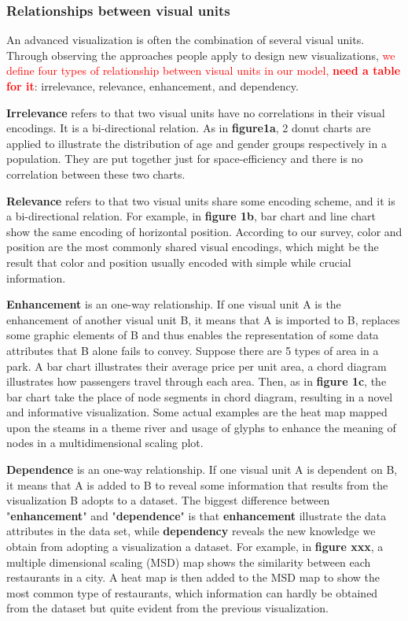 \documentclass[review,journal]{vgtc}         %
\newcommand{\wrong}[1]{\textcolor{red}{#1}}
\begin{document}
\subsubsection{Relationships between visual units}
An advanced visualization is often the combination of several visual units. Through observing the approaches people apply to design new visualizations, \wrong{we define four types of relationship between visual units in our model, \textbf{need a table for it}}: irrelevance, relevance, enhancement, and dependency. \par
\textbf{Irrelevance} refers to that two visual units have no correlations in their visual encodings. It is a bi-directional relation. As in \textbf{figure1a}, 2 donut charts are applied to illustrate the distribution of age and gender groups respectively in a population. They are put together just for space-efficiency and there is no correlation between these two charts. \par
\textbf{Relevance} refers to that two visual units share some encoding scheme, and it is a bi-directional relation. For example, in \textbf{figure 1b}, bar chart and line chart show the same encoding of horizontal position. According to our survey, color and position are the most commonly shared visual encodings, which might be the result that color and position usually encoded with simple while crucial information. \par
\textbf{Enhancement} is an one-way relationship. If one visual unit A is the enhancement of another visual unit B, it means that A is imported to B, replaces some graphic elements of B and thus enables the representation of some data attributes that B alone fails to convey. Suppose there are 5 types of area in a park. A bar chart illustrates their average price per unit area, a chord diagram illustrates how passengers travel through each area. Then, as in \textbf{figure 1c}, the bar chart take the place of node segments in chord diagram, resulting in a novel and informative visualization. Some actual examples are the heat map mapped upon the steams in a theme river\cite{wu_opinionseer:_2010}  and usage of glyphs to enhance the meaning of nodes in a multidimensional scaling plot.\cite{chen_peakvizor:_2016}\par
\textbf{Dependence} is an one-way relationship. If one visual unit A is dependent on B, it means that A is added to B to reveal some information that results from the visualization B adopts to a dataset. The biggest difference between "\textbf{enhancement}" and "\textbf{dependence}" is that \textbf{enhancement} illustrate the data attributes in the data set, while \textbf{dependency} reveals the new knowledge we obtain from adopting a visualization a dataset. For example, in \textbf{figure xxx}, a multiple dimensional scaling (MSD) map shows the similarity between each restaurants in a city. A heat map is then added to the MSD map to show the most common type of restaurants, which information can hardly be obtained from the dataset but quite evident from the previous visualization. 
\end{document}
